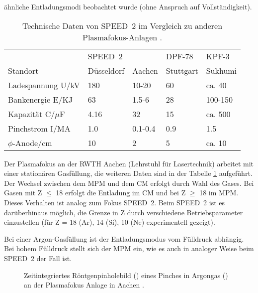 ähnliche Entladungsmodi beobachtet wurde (ohne Anspruch auf Vollständigkeit).
%
\par
\begin{table}[H]
  \center
  \begin{tabular}{|l|l|l|l|l|}
  \hline
                       & SPEED~2    &         & DPF-78    & KPF-3 \\
    Standort           & Düsseldorf & Aachen  & Stuttgart & Sukhumi \\
  \hline
    Ladespannung U/kV  & 180        & 10-20   & 60        & ca. 40 \\
    Bankenergie E/KJ   & 63         & 1.5-6   & 28        & 100-150 \\
    Kapazität C/$\mu$F & 4.16       & 32      & 15        & ca. 500 \\
    Pinchstrom I/MA    & 1.0        & 0.1-0.4 & 0.9       & 1.5 \\
    $\phi$-Anode/cm    & 10         & 2       & 5         & ca. 10 \\
  \hline
  \end{tabular}
  \caption{Technische Daten von SPEED~2 im Vergleich zu anderen
     Plasmafokus-Anlagen \cite{lebert:95,antsiferov:95,koshelev:90,yurii:priv}.}
  \label{tab:maschinen}
\end{table}
%
\par
Der Plasmafokus an der RWTH Aachen (Lehrstuhl für Lasertechnik)
\cite{lebert:95} arbeitet mit einer stationären 
Gasfüllung, die weiteren Daten sind in der Tabelle \ref{tab:maschinen}
aufgeführt. Der Wechsel zwischen dem MPM und dem CM erfolgt durch Wahl
des Gases. Bei Gasen mit Z $\le$ 18 erfolgt die Entladung im CM und bei
Z $\ge$ 18 im MPM. Dieses Verhalten ist analog zum Fokus SPEED~2. Beim
SPEED~2 ist es darüberhinaus möglich, die Grenze in Z durch
verschiedene Betriebsparameter einzustellen (für Z = 18 (Ar), 14 (Si),
10 (Ne) experimentell gezeigt).
\par
Bei einer Argon-Gasfüllung ist der Entladungsmodus vom Fülldruck
abhängig. Bei hohem Fülldruck stellt sich der MPM ein, wie es auch in
analoger Weise beim SPEED~2 der Fall ist.
%
\par
\begin{figure}[H]
  \center
  \caption{Zeitintegriertes Röntgenpinholebild ()
     eines Pinches in Argongas () an der Plasmafokus Anlage
     in Aachen \cite{lebert:95}.}
  \label{fig:lebert:pinhole}
\end{figure}
%
%
\par
